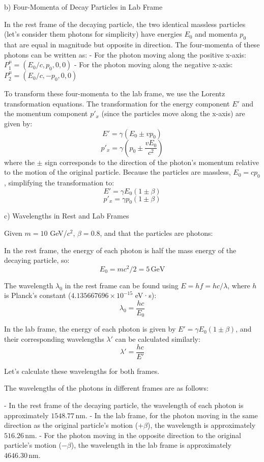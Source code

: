 \documentclass[a4paper,11pt]{article}
\begin{document}
b) Four-Momenta of Decay Particles in Lab Frame

In the rest frame of the decaying particle, the two identical massless particles (let's consider them photons for simplicity) have energies $E_0$ and momenta $p_0$ that are equal in magnitude but opposite in direction. The four-momenta of these photons can be written as:
- For the photon moving along the positive x-axis: $P_1^\mu = (E_0/c, p_0, 0, 0)$
- For the photon moving along the negative x-axis: $P_2^\mu = (E_0/c, -p_0, 0, 0)$

To transform these four-momenta to the lab frame, we use the Lorentz transformation equations. The transformation for the energy component $E'$ and the momentum component $p'_x$ (since the particles move along the x-axis) are given by:
\[ E' = \gamma (E_0 \pm vp_0) \]
\[ p'_x = \gamma (p_0 \pm \frac{vE_0}{c^2}) \]
where the $\pm$ sign corresponds to the direction of the photon's momentum relative to the motion of the original particle. Because the particles are massless, $E_0 = cp_0$, simplifying the transformation to:
\[ E' = \gamma E_0 (1 \pm \beta) \]
\[ p'_x = \gamma p_0 (1 \pm \beta) \]

c) Wavelengths in Rest and Lab Frames

Given $m = 10$ GeV/$c^2$, $\beta = 0.8$, and that the particles are photons:

In the rest frame, the energy of each photon is half the mass energy of the decaying particle, so:
\[ E_0 = mc^2 / 2 = 5 \, \text{GeV} \]

The wavelength $\lambda_0$ in the rest frame can be found using $E = hf = hc/\lambda$, where $h$ is Planck's constant ($4.135667696 \times 10^{-15}$ eV·s):
\[ \lambda_0 = \frac{hc}{E_0} \]

In the lab frame, the energy of each photon is given by $E' = \gamma E_0 (1 \pm \beta)$, and their corresponding wavelengths $\lambda'$ can be calculated similarly:
\[ \lambda' = \frac{hc}{E'} \]

Let's calculate these wavelengths for both frames.

The wavelengths of the photons in different frames are as follows:

- In the rest frame of the decaying particle, the wavelength of each photon is approximately $1548.77 \, \text{nm}$.
- In the lab frame, for the photon moving in the same direction as the original particle's motion ($+\beta$), the wavelength is approximately $516.26 \, \text{nm}$.
- For the photon moving in the opposite direction to the original particle's motion ($-\beta$), the wavelength in the lab frame is approximately $4646.30 \, \text{nm}$.
\end{document}
